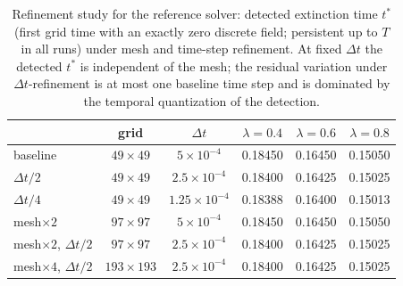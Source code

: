 \documentclass[11pt]{elsarticle}
\theoremstyle{definition}
\theoremstyle{remark}
\numberwithin{equation}{section}
\begin{document}
\begin{table}[htbp]
  \centering
  \small
  \setlength{\tabcolsep}{6pt}
  \begin{tabular}{lccccc}
    \toprule
    & grid & $\Delta t$ & $\lambda=0.4$ & $\lambda=0.6$ & $\lambda=0.8$ \\
    \midrule
    baseline          & $49\times49$   & $5\times10^{-4}$    & 0.18450 & 0.16450 & 0.15050 \\
    $\Delta t/2$      & $49\times49$   & $2.5\times10^{-4}$  & 0.18400 & 0.16425 & 0.15025 \\
    $\Delta t/4$      & $49\times49$   & $1.25\times10^{-4}$ & 0.18388 & 0.16400 & 0.15013 \\
    mesh$\times2$     & $97\times97$   & $5\times10^{-4}$    & 0.18450 & 0.16450 & 0.15050 \\
    mesh$\times2$, $\Delta t/2$ & $97\times97$ & $2.5\times10^{-4}$ & 0.18400 & 0.16425 & 0.15025 \\
    mesh$\times4$, $\Delta t/2$ & $193\times193$ & $2.5\times10^{-4}$ & 0.18400 & 0.16425 & 0.15025 \\
    \bottomrule
  \end{tabular}
  \caption{Refinement study for the reference solver: detected extinction
    time $t^*$ (first grid time with an exactly zero discrete field;
    persistent up to $T$ in all runs) under mesh and time-step refinement.
    At fixed $\Delta t$ the detected $t^*$ is independent of the mesh; the
    residual variation under $\Delta t$-refinement is at most one baseline
    time step and is dominated by the temporal quantization of the
    detection.}
  \label{tab:relay-ref-convergence}
\end{table}
\end{document}
